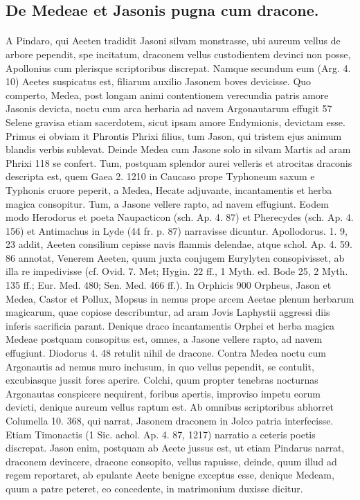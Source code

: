 \documentclass[a4paper, 11pt, oneside, polutonikogreek, german]{article}
\begin{document}
\subsection{De Medeae et Jasonis pugna cum dracone.}
\paragraph{}
A Pindaro, qui Aeeten tradidit Jasoni silvam monstrasse, ubi aureum vellus de arbore pependit, spe incitatum, draconem vellus custodientem devinci non posse, Apollonius cum plerisque scriptoribus discrepat. Namque secundum eum (Arg. 4. 10) Aeetes suspicatus est, filiarum auxilio Jasonem boves devicisse. Quo comperto, Medea, post longam animi contentionem verecundia patris amore Jasonis devicta, noctu cum arca herbaria ad navem Argonautarum effugit 57 Selene gravisa etiam sacerdotem, sicut ipsam amore Endymionis, devictam esse. Primus ei obviam it Phrontis Phrixi filius, tum Jason, qui tristem ejus animum blandis verbis sublevat. Deinde Medea cum Jasone solo in silvam Martis ad aram Phrixi 118 se confert. Tum, postquam splendor aurei velleris et atrocitas draconis descripta est, quem Gaea 2. 1210 in Caucaso prope Typhoneum saxum e Typhonis cruore peperit, a Medea, Hecate adjuvante, incantamentis et herba magica consopitur. Tum, a Jasone vellere rapto, ad navem effugiunt. Eodem modo Herodorus et poeta Naupacticon (sch. Ap. 4. 87) et Pherecydes (sch. Ap. 4. 156) et Antimachus in Lyde (44 fr. p. 87) narravisse dicuntur. Apollodorus. 1. 9, 23 addit, Aeeten consilium cepisse navis flammis delendae, atque schol. Ap. 4. 59. 86 annotat, Venerem Aeeten, quum juxta conjugem Eurylyten consopivisset, ab illa re impedivisse (cf. Ovid. 7. Met; Hygin. 22 ff., 1 Myth. ed. Bode 25, 2 Myth. 135 ff.; Eur. Med. 480; Sen. Med. 466 ff.). In Orphicis 900 Orpheus, Jason et Medea, Castor et Pollux, Mopsus in nemus prope arcem Aeetae plenum herbarum magicarum, quae copiose describuntur, ad aram Jovis Laphystii aggressi diis inferis sacrificia parant. Denique draco incantamentis Orphei et herba magica Medeae postquam consopitus est, omnes, a Jasone vellere rapto, ad navem effugiunt. Diodorus 4. 48 retulit nihil de dracone. Contra Medea noctu cum Argonautis ad nemus muro inclusum, in quo vellus pependit, se contulit, excubiasque jussit fores aperire. Colchi, quum propter tenebras nocturnas Argonautas conspicere nequirent, foribus apertis, improviso impetu eorum devicti, denique aureum vellus raptum est. Ab omnibus scriptoribus abhorret Columella 10. 368, qui narrat, Jasonem draconem in Jolco patria interfecisse. Etiam Timonactis (1 Sic. achol. Ap. 4. 87, 1217) narratio a ceteris poetis discrepat. Jason enim, postquam ab Aeete jussus est, ut etiam Pindarus narrat, draconem devincere, dracone consopito, vellus rapuisse, deinde, quum illud ad regem reportaret, ab epulante Aeete benigne exceptus esse, denique Medeam, quum a patre peteret, eo concedente, in matrimonium duxisse dicitur.
\end{document}
